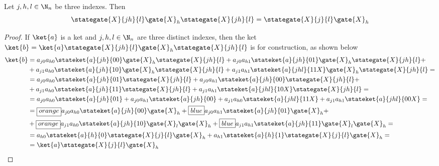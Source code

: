 \documentclass[sigconf,natbib=false]{acmart}
\begin{document}
\begin{proposition}
	Let $j,h,l \in \N_n$ be three indexes.
	Then
	\begin{equation}
		\label{eq:submainresult}
		\stategate{X}{jh}{l}\gate{X}_h\stategate{X}{jh}{l} = \stategate{X}{j}{l}\gate{X}_h
	\end{equation}
\end{proposition}
\begin{proof}
	If $\ket{a}$ is a ket and $j,h,l \in \N_n$ are three distinct indexes, then
	the ket
	$\ket{b}=\ket{a}\stategate{X}{jh}{l}\gate{X}_h\stategate{X}{jh}{l}$
	is for construction, as shown below
	\begin{align*}
		\ket{b}
		&=a_{j0}a_{h0}\stateket{a}{jh}{00}\gate{X}_h\stategate{X}{jh}{l} +		a_{j0}a_{h1}\stateket{a}{jh}{01}\gate{X}_h\stategate{X}{jh}{l} +\\
		&+a_{j1}a_{h0}\stateket{a}{jh}{10}\gate{X}_h\stategate{X}{jh}{l} + a_{j1}a_{h1}\stateket{a}{jhl}{11X}\gate{X}_h\stategate{X}{jh}{l} =\\
		&=a_{j0}a_{h0}\stateket{a}{jh}{01}\stategate{X}{jh}{l} + a_{j0}a_{h1}\stateket{a}{jh}{00}\stategate{X}{jh}{l} +\\
		&+a_{j1}a_{h0}\stateket{a}{jh}{11}\stategate{X}{jh}{l} + a_{j1}a_{h1}\stateket{a}{jhl}{10X}\stategate{X}{jh}{l}=\\
		&=a_{j0}a_{h0}\stateket{a}{jh}{01} + a_{j0}a_{h1}\stateket{a}{jh}{00}+ a_{j1}a_{h0}\stateket{a}{jhl}{11X} + a_{j1}a_{h1}\stateket{a}{jhl}{00X}=\\
		&=\boxed{orange}{a_{j0}a_{h0}\stateket{a}{jh}{00}\gate{X}_h}+\boxed{blue}{a_{j0}a_{h1}\stateket{a}{jh}{01}\gate{X}_h}+\\
		&+\boxed{orange}{a_{j1}a_{h0}\stateket{a}{jh}{10}\gate{X}_l\gate{X}_h}+\boxed{blue}{a_{j1}a_{h1}\stateket{a}{jh}{11}\gate{X}_l\gate{X}_h}=\\
		&=a_{h0}\stateket{a}{h}{0}\stategate{X}{j}{l}\gate{X}_h+a_{h1}\stateket{a}{h}{1}\stategate{X}{j}{l}\gate{X}_h=\\
		&=\ket{a}\stategate{X}{j}{l}\gate{X}_h
	\end{align*}
\end{proof}
\end{document}
